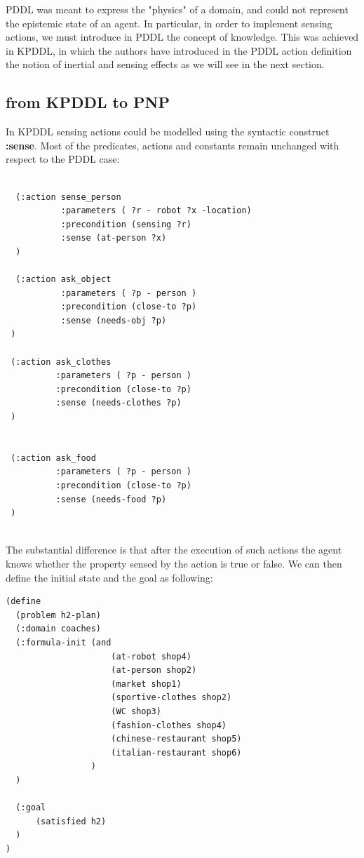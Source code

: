 \documentclass[pdftex,12pt,a4paper]{report}
\begin{document}

\noindent PDDL was meant to express the "physics" of a domain, and could not represent the epistemic state of an agent.
In particular, in order to implement sensing actions, we must introduce in PDDL the concept of knowledge. This was achieved in KPDDL\cite{iocchi2003}, in which the authors have introduced in the PDDL action definition the notion of inertial and sensing effects as we will see in the next section.

\subsection{from KPDDL to PNP}
In KPDDL sensing actions could be modelled using the syntactic construct \textbf{:sense}. Most of the predicates, actions and constants remain unchanged with respect to the PDDL case:
\begin{verbatim}

  (:action sense_person
           :parameters ( ?r - robot ?x -location)
           :precondition (sensing ?r)
           :sense (at-person ?x)
  )

  (:action ask_object
           :parameters ( ?p - person )
           :precondition (close-to ?p)
           :sense (needs-obj ?p)
 )

 (:action ask_clothes
          :parameters ( ?p - person )
          :precondition (close-to ?p)
          :sense (needs-clothes ?p)
 )


 (:action ask_food
          :parameters ( ?p - person )
          :precondition (close-to ?p)
          :sense (needs-food ?p)
 )
\end{verbatim}\\
\noindent The substantial difference is that after the execution of such actions the agent knows whether the property sensed by the action is true or false. 
\noindent We can then define the initial state and the goal as following:
\begin{verbatim}
(define
  (problem h2-plan)
  (:domain coaches)
  (:formula-init (and
                     (at-robot shop4)
                     (at-person shop2)
                     (market shop1)
                     (sportive-clothes shop2)
                     (WC shop3)
                     (fashion-clothes shop4)
                     (chinese-restaurant shop5)
                     (italian-restaurant shop6)
                 )
  )

  (:goal
      (satisfied h2)
  )
)
\end{verbatim}
\end{document}
